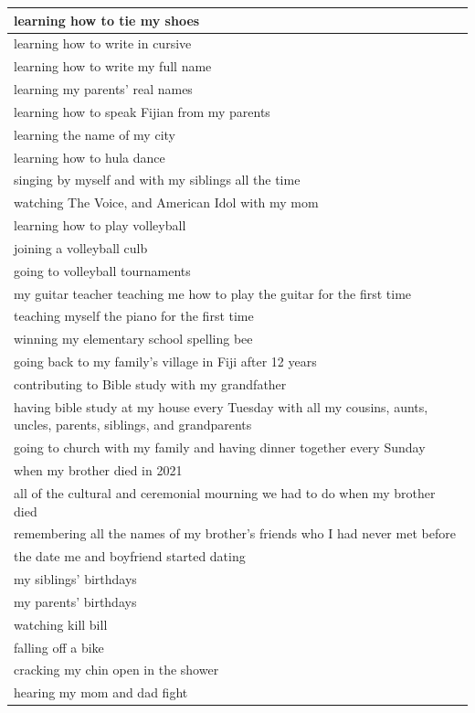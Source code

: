 \documentclass[
  .7em,
  letterpaper,
  DIV=11,
  numbers=noendperiod]{scrartcl}
\begin{document}
\begin{table}
\begin{tabular}{l}
\hline
learning how to tie my shoes\\
\hline
learning how to write in cursive\\
\hline
learning how to write my full name\\
\hline
learning my parents' real names\\
\hline
learning how to speak Fijian from my parents\\
\hline
learning the name of my city\\
\hline
learning how to hula dance\\
\hline
singing by myself and with my siblings all the time\\
\hline
watching The Voice, and American Idol with my mom\\
\hline
learning how to play volleyball\\
\hline
joining a volleyball culb\\
\hline
going to volleyball tournaments\\
\hline
my guitar teacher teaching me how to play the guitar for the first time\\
\hline
teaching myself the piano for the first time\\
\hline
winning my elementary school spelling bee\\
\hline
going back to my family's village in Fiji after 12 years\\
\hline
contributing to Bible study with my grandfather\\
\hline
having bible study at my house every Tuesday with all my cousins, aunts, uncles, parents, siblings, and grandparents\\
\hline
going to church with my family and having dinner together every Sunday\\
\hline
when my brother died in 2021\\
\hline
all of the cultural and ceremonial mourning we had to do when my brother died\\
\hline
remembering all the names of my brother's friends who I had never met before\\
\hline
the date me and boyfriend started dating\\
\hline
my siblings' birthdays\\
\hline
my parents' birthdays\\
\hline
watching kill bill\\
\hline
falling off a bike\\
\hline
cracking my chin open in the shower\\
\hline
hearing my mom and dad fight\\

\end{tabular}
\end{table}
\end{document}
